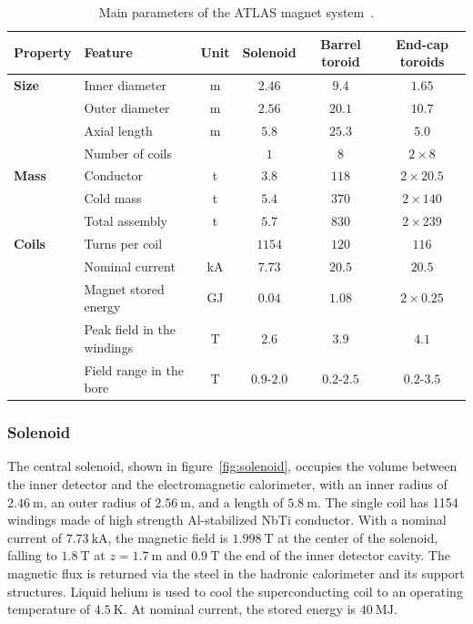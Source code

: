 \begin{table}[htbp]
	\centering
	\scriptsize
	\begin{tabular}{|l|l|c|c|c|c|}
		\hline
		\textbf{Property} & \textbf{Feature} & \textbf{Unit} & \textbf{Solenoid} & \textbf{Barrel toroid} & \textbf{End-cap toroids} \\
		\hline
		\textbf{Size} & Inner diameter & m & $2.46$ & $9.4$ & $1.65$ \\
		\hline
		 & Outer diameter & m & $2.56$ & $20.1$ & $10.7$ \\
		\hline
		 & Axial length & m & $5.8$ & $25.3$ & $5.0$ \\
		\hline
		 & Number of coils & & $1$ & $8$ & $2\times 8$ \\
		\hline
		\textbf{Mass} & Conductor & t & $3.8$ & $118$ & $2\times 20.5$ \\
		\hline
		 & Cold mass & t & $5.4$ & $370$ & $2\times 140$ \\
		\hline
		 & Total assembly & t & $5.7$ & $830$ & $2\times 239$ \\
		\hline
		\textbf{Coils} & Turns per coil & & $1154$ & $120$ & $116$ \\
		\hline
		 & Nominal current & kA & $7.73$ & $20.5$ & $20.5$ \\
		\hline
		 & Magnet stored energy & GJ & $0.04$ & $1.08$ & $2\times 0.25$ \\
		\hline
		 & Peak field in the windings & T & $2.6$ & $3.9$ & $4.1$ \\
		\hline
		 & Field range in the bore & T & $0.9$-$2.0$ & $0.2$-$2.5$ & $0.2$-$3.5$ \\
		\hline
	\end{tabular}
	\caption{Main parameters of the ATLAS magnet system~\cite{TheATLASCollaboration:2008fg}.}
	\label{table:ATLAS-magnet-parameters}
\end{table}




\subsubsection{Solenoid}\label{sec:ATLAS-magnets-solenoid}

The central solenoid, shown in figure~\ref{fig:solenoid}, occupies the volume between the inner detector and the electromagnetic calorimeter, with an inner radius of $\SI{2.46}{\meter}$, an outer radius of $\SI{2.56}{\meter}$, and a length of $\SI{5.8}{\meter}$. The single coil has 1154 windings made of high strength Al-stabilized NbTi conductor. With a nominal current of $\SI{7.73}{\kilo\ampere}$, the magnetic field is $\SI{1.998}{\tesla}$ at the center of the solenoid, falling to $\SI{1.8}{\tesla}$ at $z=\SI{1.7}{\meter}$ and $\SI{0.9}{\tesla}$ the end of the inner detector cavity.  The magnetic flux is returned via the steel in the hadronic calorimeter and its support structures. Liquid helium is used to cool the superconducting coil to an operating temperature of $\SI{4.5}{\kelvin}$. At nominal current, the stored energy is $\SI{40}{\mega\joule}$. 

